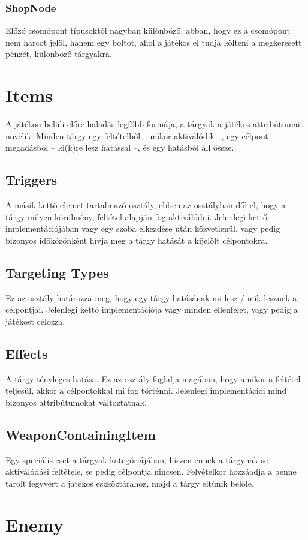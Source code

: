 \documentclass[
]{thesis-ekf}
\theoremstyle{definition}
\theoremstyle{remark}
\begin{document}
	\subsubsection{ShopNode}
	Előző csomópont típusoktól nagyban különböző, abban, hogy ez a csomópont nem harcot jelöl, hanem egy boltot, ahol a játékos el tudja költeni a megkeresett pénzét, különböző tárgyakra.
	
	\section{Items}
	A játékon belüli előre haladás legfőbb formája, a tárgyak a játékos attribútumait növelik. Minden tárgy egy feltételből -- mikor aktiválódik --, egy célpont megadásból -- ki(k)re lesz hatással --, és egy hatásból áll össze.
	\subsection{Triggers}
	A másik kettő elemet tartalmazó osztály, ebben az osztályban dől el, hogy a tárgy milyen körülmény, feltétel alapján fog aktiválódni. Jelenlegi kettő implementációjában vagy egy szoba elkezdése után közvetlenül, vagy pedig bizonyos időközönként hívja meg a tárgy hatását a kijelölt célpontokra.
	\subsection{Targeting Types}
	Ez az osztály határozza meg, hogy egy tárgy hatásának mi lesz / mik lesznek a célpontjai. Jelenlegi kettő implementációja vagy minden ellenfelet, vagy pedig a játékost célozza.
	\subsection{Effects}
	A tárgy tényleges hatása. Ez az osztály foglalja magában, hogy amikor a feltétel teljesül, akkor a célpontokkal mi fog történni. Jelenlegi implementációi mind bizonyos attribútumokat változtatnak.
	\subsection{WeaponContainingItem}
	Egy speciális eset a tárgyak kategóriájában, hiszen ennek a tárgynak se aktiválódási feltétele, se pedig célpontja nincsen. Felvételkor hozzáadja a benne tárolt fegyvert a játékos eszköztárához, majd a tárgy eltűnik belőle.
	\section{Enemy}
\end{document}
